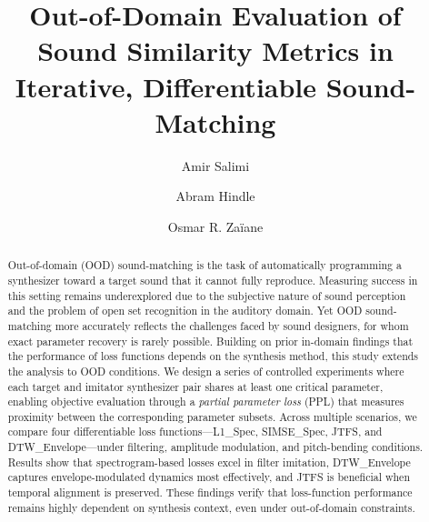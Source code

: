 \documentclass[runningheads]{llncs}
\begin{document}
\title{Out-of-Domain Evaluation of Sound Similarity Metrics in Iterative, Differentiable Sound-Matching}
%

\author{Amir Salimi \and
Abram Hindle \and
Osmar R. Zaïane}
%
%

\maketitle              %
%

\begin{abstract}
Out-of-domain (OOD) sound-matching is the task of automatically programming a synthesizer toward a target sound that it cannot fully reproduce. 
Measuring success in this setting remains underexplored due to the subjective nature of sound perception and the problem of open set recognition in the auditory domain. 
Yet OOD sound-matching more accurately reflects the challenges faced by sound designers, for whom exact parameter recovery is rarely possible. 
Building on prior in-domain findings that the performance of loss functions depends on the synthesis method, this study extends the analysis to OOD conditions. 
We design a series of controlled experiments where each target and imitator synthesizer pair shares at least one critical parameter, enabling objective evaluation through a \emph{partial parameter loss} (PPL) that measures proximity between the corresponding parameter subsets. 
Across multiple scenarios, we compare four differentiable loss functions—L1\_Spec, SIMSE\_Spec, JTFS, and DTW\_Envelope—under filtering, amplitude modulation, and pitch-bending conditions. 
Results show that spectrogram-based losses excel in filter imitation, DTW\_Envelope captures envelope-modulated dynamics most effectively, and JTFS is beneficial when temporal alignment is preserved. 
These findings verify that loss-function performance remains highly dependent on synthesis context, even under out-of-domain constraints.
\end{abstract}
\end{document}
